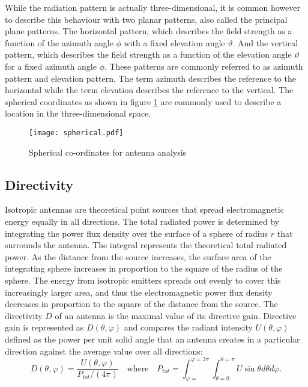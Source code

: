While the radiation pattern is actually three-dimensional, it is common however to describe this behaviour with two planar patterns, also called the principal plane patterns. The horizontal pattern, which describes the field strength as a function of the azimuth angle $\phi$  with a fixed elevation angle $ \vartheta$. And the vertical pattern, which describes the field strength as a function of the elevation angle $\vartheta$  for a fixed azimuth angle $\phi$. These patterns are commonly referred to as azimuth pattern and elevation pattern. The term azimuth describes the reference to the horizontal while the term elevation describes the reference to the vertical. The spherical coordinates as shown in figure \ref{spherical} are commonly used to describe a location in the three-dimensional space.

\begin{figure}[H]
	\begin{center}
	\vspace{-1cm}
		\texttt{[image: spherical.pdf]}
			\vspace{-1cm} 	\caption{\label{spherical}Spherical co-ordinates for antenna analysis \cite{balanis}}
	\end{center}
\end{figure}

\subsection{Directivity}

Isotropic antennas are theoretical point sources that spread electromagnetic energy equally in all directions. The total radiated power is determined by integrating the power flux density over the surface of a sphere of radius $r$ that surrounds the antenna. The integral represents the theoretical total radiated power. As the distance from the source increases, the surface area of the integrating sphere increases in proportion to the square of the radius of the sphere. The energy from isotropic emitters spreads out evenly to cover this increasingly larger area, and thus the electromagnetic power flux density decreases in proportion to the square of the distance from the source.
The directivity  $D$  of an antenna is the maximal value of its directive gain. Directive gain is represented as  $D \left(  \theta , \varphi  \right)$  and compares the radiant intensity  $U \left(  \theta , \varphi  \right)$  defined as the power per unit solid angle that an antenna creates in a particular direction against the average value over all directions:
\begin{equation}
D \left(  \theta , \varphi  \right) = \frac{ U \left(  \theta , \varphi  \right) }{P_{tot}/ \left( 4 \pi  \right) } \quad  \mbox{where} \quad  P_{tot}= \int_{ \varphi =}^{ \varphi =2 \pi } \int_{ \theta =0}^{ \theta = \pi }U\sin  \theta d \theta d \varphi.
\label{directivity}
\end{equation}

